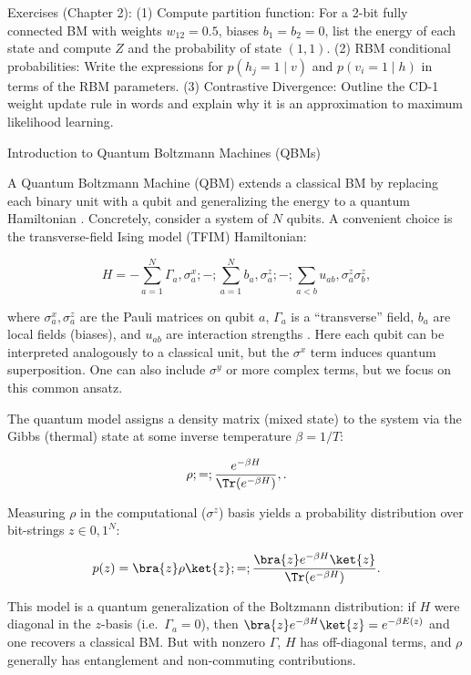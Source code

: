Exercises (Chapter 2): (1) Compute partition function: For a 2-bit fully connected BM with weights $w_{12}=0.5$, biases $b_1=b_2=0$, list the energy of each state and compute $Z$ and the probability of state $(1,1)$. (2) RBM conditional probabilities: Write the expressions for $p(h_j=1\mid v)$ and $p(v_i=1\mid h)$ in terms of the RBM parameters. (3) Contrastive Divergence: Outline the CD-1 weight update rule in words and explain why it is an approximation to maximum likelihood learning.





Introduction to Quantum Boltzmann Machines (QBMs)





A Quantum Boltzmann Machine (QBM) extends a classical BM by replacing each binary unit with a qubit and generalizing the energy to a quantum Hamiltonian .  Concretely, consider a system of $N$ qubits. A convenient choice is the transverse-field Ising model (TFIM) Hamiltonian:

$$

H = -\sum_{a=1}^N \Gamma_a,\sigma^x_a ;-;\sum_{a=1}^N b_a,\sigma^z_a ;-;\sum_{a<b} u_{ab},\sigma^z_a \sigma^z_b,

$$

where $\sigma_a^x,\sigma_a^z$ are the Pauli matrices on qubit $a$, $\Gamma_a$ is a “transverse” field, $b_a$ are local fields (biases), and $u_{ab}$ are interaction strengths .  Here each qubit can be interpreted analogously to a classical unit, but the $\sigma^x$ term induces quantum superposition.  One can also include $\sigma^y$ or more complex terms, but we focus on this common ansatz.



The quantum model assigns a density matrix (mixed state) to the system via the Gibbs (thermal) state at some inverse temperature $\beta=1/T$:

$$

\rho ;=; \frac{e^{-\beta H}}{\Tr(e^{-\beta H})},.

$$

Measuring $\rho$ in the computational ($\sigma^z$) basis yields a probability distribution over bit-strings $z\in{0,1}^N$:

$$

p(z) = \bra{z} \rho \ket{z} ;=; \frac{\bra{z} e^{-\beta H} \ket{z}}{\Tr(e^{-\beta H})}.

$$

This model is a quantum generalization of the Boltzmann distribution: if $H$ were diagonal in the $z$-basis (i.e.\ $\Gamma_a=0$), then $\bra{z} e^{-\beta H} \ket{z} = e^{-\beta E(z)}$ and one recovers a classical BM. But with nonzero $\Gamma$, $H$ has off-diagonal terms, and $\rho$ generally has entanglement and non-commuting contributions.



